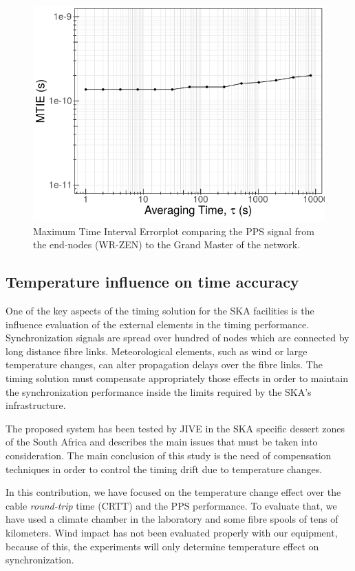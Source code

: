 \begin{figure}
	\centering
	\includegraphics[width=0.7\linewidth]{img/mtie_exp3}
	\caption[MTIE of the end-nodes in the scalability test.]{Maximum Time 
	Interval Errorplot comparing the PPS signal from the end-nodes (WR-ZEN) to 
	the Grand Master of the network.}
	\label{fig:mtienet}
\end{figure}

\subsection{Temperature influence on time accuracy}
\label{subsec:temp}

One of the key aspects of the timing solution for the SKA facilities is the 
influence evaluation of the external elements in the timing performance. 
Synchronization signals are spread over hundred of nodes which are connected by 
long distance fibre links. Meteorological elements, such as wind or large 
temperature changes, can alter propagation delays over the fibre 
links. The timing solution must compensate appropriately those effects in order 
to maintain the synchronization performance inside the limits required by the 
SKA's infrastructure. 

The proposed system has been tested by JIVE in the SKA specific dessert zones of 
the South Africa and \cite{paul-boven-paper-icalepcs} describes the main issues 
that must be taken into consideration. The main conclusion of this study is the
need of compensation techniques in order to control the timing drift due to
temperature changes.

In this contribution, we have focused on the temperature change effect over the 
cable
\textit{round-trip} time (CRTT) and the PPS performance. To evaluate that, we 
have used a climate chamber in the laboratory and some fibre spools of tens of 
kilometers. 
Wind impact has not been evaluated properly with our equipment, because of this, 
the experiments will only determine temperature effect on synchronization.

